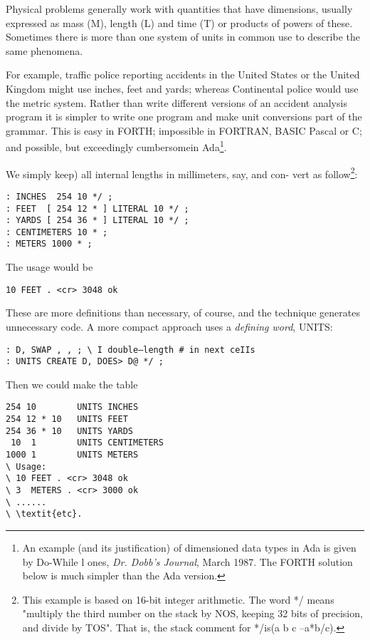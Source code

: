 Physical problems generally work with quantities that have dimensions, usually expressed as mass (M), length (L) and time (T) or products of powers of these. Sometimes there is more than one system of units in common use to describe the same phenomena.

For example, traffic police reporting accidents in the United States or the United Kingdom might use inches, feet and yards; whereas Continental police would use the metric system. Rather than write different versions of an accident analysis program it is simpler to write one program and make unit conversions part of the grammar. This is easy in FORTH; impossible in FORTRAN, BASIC Pascal or C; and possible, but exceedingly cumbersomein Ada\footnote{An example (and its justification) of dimensioned data types in Ada is given by Do-While l ones, \textit{Dr. Dobb's Journal}, March 1987. The FORTH solution below is much simpler than the Ada version.}.

We simply keep) all internal lengths in millimeters, say, and con-
vert as follow\footnote{This example is based on 16-bit integer arithmetic. The word */ means "multiply the third number on the stack by NOS, keeping 32 bits of precision, and divide by TOS". That is, the stack comment for */is(a b c --a*b/c).}:

\begin{lstlisting}
: INCHES  254 10 */ ;
: FEET  [ 254 12 * ] LITERAL 10 */ ;
: YARDS [ 254 36 * ] LITERAL 10 */ ;
: CENTIMETERS 10 * ;
: METERS 1000 * ;
\end{lstlisting}

The usage would be
\begin{lstlisting}
10 FEET . <cr> 3048 ok
\end{lstlisting}

These are more definitions than necessary, of course, and the technique generates unnecessary code. A more compact approach uses a \textit{defining word}, UNITS:

\begin{lstlisting}
: D, SWAP , , ; \ I double—length # in next ceIIs
: UNITS CREATE D, DOES> D@ */ ;
\end{lstlisting}

Then we could make the table
\begin{lstlisting}
254 10        UNITS INCHES
254 12 * 10   UNITS FEET
254 36 * 10   UNITS YARDS
 10  1        UNITS CENTIMETERS
1000 1        UNITS METERS
\ Usage:
\ 10 FEET . <cr> 3048 ok
\ 3  METERS . <cr> 3000 ok
\ ......
\ \textit{etc}.
\end{lstlisting}

